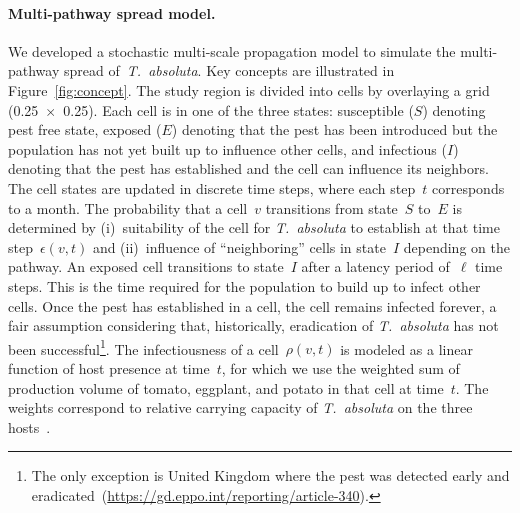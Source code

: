 \documentclass[11pt]{article}
\newcommand{\tuta}{\emph{T.~absoluta}}
\newcommand{\infest}{\rho}
\newcommand{\suitable}{\epsilon}
\newcommand{\aacomment}[1]{({\color{magenta}AA: #1})}
\newcommand{\veg}{\mathrm{V}}
\newcommand{\temp}{\mathrm{T}}
\newcommand{\consume}{\mathrm{Pop}}
\theoremstyle{definition}
\begin{document}

\paragraph{Multi-pathway spread model.} We developed a stochastic
multi-scale propagation model to simulate the multi-pathway spread
of~\tuta{}. Key concepts are illustrated in Figure~\ref{fig:concept}. The
study region is divided into cells by overlaying a grid
(0.25\textdegree~$\times$~0.25\textdegree). Each cell is in one of the
three states: susceptible ($S$) denoting pest free state, exposed ($E$)
denoting that the pest has been introduced but the population has not yet
built up to influence other cells, and infectious ($I$) denoting that the
pest has established and the cell can influence its neighbors. The cell
states are updated in discrete time steps, where each step~$t$ corresponds
to a month.  The probability that a cell~$v$ transitions from state~$S$
to~$E$ is determined by (i)~suitability of the cell for \tuta{} to
establish at that time step~$\suitable(v,t)$ and (ii)~influence of
``neighboring'' cells in state~$I$ depending on the pathway. An exposed
cell transitions to state~$I$ after a latency period of~$\ell$ time steps.
This is the time required for the population to build up to infect other
cells.  Once the pest has established in a cell, the cell remains infected
forever, a fair assumption considering that, historically, eradication of
\tuta{} has not been successful\footnote{The only exception is United
Kingdom where the pest was detected early and
eradicated~(\url{https://gd.eppo.int/reporting/article-340}).}.  The
infectiousness of a cell~$\infest(v,t)$ is modeled as a linear function of
host presence at time~$t$, for which we use the weighted sum of production
volume of tomato, eggplant, and potato in that cell at time~$t$. The
weights correspond to relative carrying capacity of \tuta{} on the three
hosts~\cite{sylla2018}.
\end{document}

